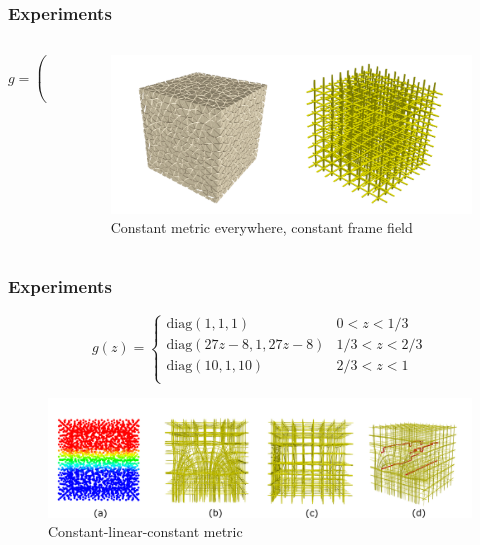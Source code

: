 \documentclass[
	11pt, %
	aspectratio=169, %
]{beamer}
\begin{document}
\begin{frame}
	\frametitle{Experiments}
	\begin{columns}[c] %
	
		\begin{column}{0.25\textwidth} %
			$$g=\begin{pmatrix}
				1 & 0 & 0 \\ 0 & 1 & 0 \\ 0 & 0 & 1
			\end{pmatrix}$$
		\end{column}
		\begin{column}{0.7\textwidth} %
			\begin{figure}
				\includegraphics[width=\linewidth]{image1.png}
				\caption{Constant metric everywhere, constant frame field}
			\end{figure}
		\end{column}
	\end{columns}
\end{frame}
\begin{frame}
	\frametitle{Experiments}	
	\begin{equation}
		g(z) = \begin{cases}
			\mathrm{diag}(1,1,1) &0 < z < 1/3 \\
			\mathrm{diag}(27z-8,1,27z-8) &1/3 < z < 2/3 \\
			\mathrm{diag}(10,1,10) &2/3 < z < 1 \\
	\end{cases}\end{equation}\label{eq:metric}
	\begin{figure}
		\includegraphics[width=0.9\linewidth]{image2.png}
		\caption{Constant-linear-constant metric}
	\end{figure}
\end{frame}
\end{document}
